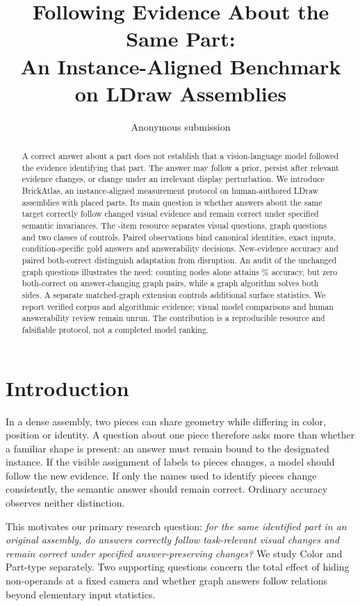 \documentclass[10pt,twocolumn,letterpaper]{article}
\title{Following Evidence About the Same Part:\\
An Instance-Aligned Benchmark on LDraw Assemblies}
\author{Anonymous submission}
\begin{document}
\maketitle

\begin{abstract}
A correct answer about a part does not establish that a vision-language
model followed the evidence identifying that part. The answer may follow
a prior, persist after relevant evidence changes, or change under an
irrelevant display perturbation. We introduce BrickAtlas, an
instance-aligned measurement protocol on \EvSources{} human-authored
LDraw assemblies with \EvParts{} placed parts. Its main question is whether
answers about the same target correctly follow changed visual evidence
and remain correct under specified semantic invariances. The
\EvTasks{}-item resource separates \EvVisual{} visual questions,
\EvStructural{} graph questions and two classes of controls. Paired
observations bind canonical identities, exact inputs, condition-specific
gold answers and answerability decisions. New-evidence accuracy and
paired both-correct distinguish adaptation from disruption.
An audit of the unchanged graph questions illustrates the need:
counting nodes alone attains \EvNodeMicro\% accuracy, but zero
both-correct on answer-changing graph pairs, while a graph algorithm
solves both sides. A separate matched-graph extension controls additional
surface statistics. We report verified corpus and algorithmic evidence;
visual model comparisons and human answerability review remain unrun.
The contribution is a reproducible resource and falsifiable protocol,
not a completed model ranking.
\end{abstract}

\section{Introduction}
In a dense assembly, two pieces can share geometry while differing in
color, position or identity. A question about one piece therefore asks
more than whether a familiar shape is present: an answer must remain
bound to the designated instance. If the visible assignment of labels
to pieces changes, a model should follow the new evidence. If only the
names used to identify pieces change consistently, the semantic answer
should remain correct. Ordinary accuracy observes neither distinction.

This motivates our primary research question: \emph{for the same
identified part in an original assembly, do answers correctly follow
task-relevant visual changes and remain correct under specified
answer-preserving changes?} We study Color and Part-type separately.
Two supporting questions concern the total effect of hiding
non-operands at a fixed camera and whether graph answers follow
relations beyond elementary input statistics.
\end{document}
